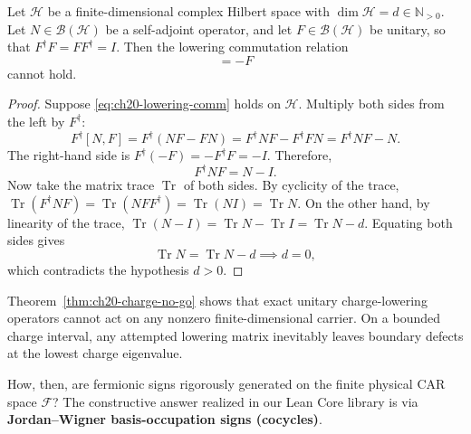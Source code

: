 \begin{theorem}
\label{thm:ch20-charge-no-go}
Let $\mathcal H$ be a finite-dimensional complex Hilbert space with $\dim\mathcal H = d \in \mathbb N_{>0}$.
Let $N \in \mathcal B(\mathcal H)$ be a self-adjoint operator, and let $F \in \mathcal B(\mathcal H)$ be unitary,
so that $F^\dagger F = F F^\dagger = I$.
Then the lowering commutation relation
\begin{equation}
 [N, F] = -F
 \label{eq:ch20-lowering-comm}
\end{equation}
cannot hold.
\end{theorem}
\begin{proof}
Suppose \eqref{eq:ch20-lowering-comm} holds on $\mathcal H$.
Multiply both sides from the left by $F^\dagger$:
\[
 F^\dagger [N, F] = F^\dagger(NF - FN) = F^\dagger N F - F^\dagger F N = F^\dagger N F - N.
\]
The right-hand side is $F^\dagger(-F) = -F^\dagger F = -I$.
Therefore,
\[
 F^\dagger N F = N - I.
\]
Now take the matrix trace $\operatorname{Tr}$ of both sides.
By cyclicity of the trace,
$\operatorname{Tr}(F^\dagger N F) = \operatorname{Tr}(N F F^\dagger) = \operatorname{Tr}(N I) = \operatorname{Tr} N$.
On the other hand, by linearity of the trace,
$\operatorname{Tr}(N - I) = \operatorname{Tr} N - \operatorname{Tr} I = \operatorname{Tr} N - d$.
Equating both sides gives
\[
 \operatorname{Tr} N = \operatorname{Tr} N - d \implies d = 0,
\]
which contradicts the hypothesis $d > 0$.
\end{proof}

Theorem~\ref{thm:ch20-charge-no-go} shows that exact unitary charge-lowering operators cannot
act on any nonzero finite-dimensional carrier.  On a bounded charge interval, any attempted
lowering matrix inevitably leaves boundary defects at the lowest charge eigenvalue.

How, then, are fermionic signs rigorously generated on the finite physical CAR space $\mathcal F$?
The constructive answer realized in our Lean Core library is via
\textbf{Jordan--Wigner basis-occupation signs (cocycles)}.

